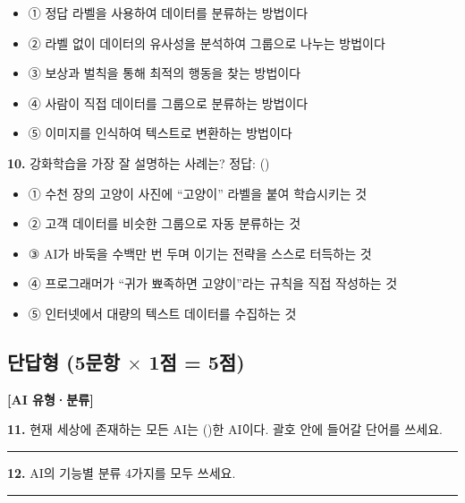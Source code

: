 \documentclass[11pt,a4paper]{article}
\begin{document}
\begin{itemize}[leftmargin=2em, label={}]
    \item ① 정답 라벨을 사용하여 데이터를 분류하는 방법이다
    \item ② 라벨 없이 데이터의 유사성을 분석하여 그룹으로 나누는 방법이다
    \item ③ 보상과 벌칙을 통해 최적의 행동을 찾는 방법이다
    \item ④ 사람이 직접 데이터를 그룹으로 분류하는 방법이다
    \item ⑤ 이미지를 인식하여 텍스트로 변환하는 방법이다
\end{itemize}

\bigskip

\noindent\textbf{10.} 강화학습을 가장 잘 설명하는 사례는? \hfill 정답: (\hspace{1.5cm})

\begin{itemize}[leftmargin=2em, label={}]
    \item ① 수천 장의 고양이 사진에 ``고양이'' 라벨을 붙여 학습시키는 것
    \item ② 고객 데이터를 비슷한 그룹으로 자동 분류하는 것
    \item ③ AI가 바둑을 수백만 번 두며 이기는 전략을 스스로 터득하는 것
    \item ④ 프로그래머가 ``귀가 뾰족하면 고양이''라는 규칙을 직접 작성하는 것
    \item ⑤ 인터넷에서 대량의 텍스트 데이터를 수집하는 것
\end{itemize}

\newpage

\subsection{단답형 (5문항 \(\times\) 1점 = 5점)}

\noindent\textbf{[AI 유형·분류]}

\bigskip

\noindent\textbf{11.} 현재 세상에 존재하는 모든 AI는 (\hspace{2cm})한 AI이다. 괄호 안에 들어갈 단어를 쓰세요.

\vspace{1.5cm}
\noindent\rule{\textwidth}{0.4pt}

\bigskip\bigskip

\noindent\textbf{12.} AI의 기능별 분류 4가지를 모두 쓰세요.

\vspace{2cm}
\noindent\rule{\textwidth}{0.4pt}
\end{document}
